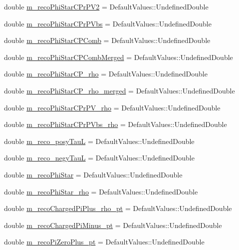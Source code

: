 \begin{DoxyCompactItemize}
\item 
double \hyperlink{classHttProduct_ac8e1ce629cd837f8fc345c13390ceec9}{m\_\-recoPhiStarCPrPV2} = DefaultValues::UndefinedDouble
\item 
double \hyperlink{classHttProduct_a098ffec9c6c3ed02c71847654cbbd3d4}{m\_\-recoPhiStarCPrPVbs} = DefaultValues::UndefinedDouble
\item 
double \hyperlink{classHttProduct_a94f1cb54eab52625888eda222d67e21d}{m\_\-recoPhiStarCPComb} = DefaultValues::UndefinedDouble
\item 
double \hyperlink{classHttProduct_a1d8bfbc2f1469b322c46f058b8a2eaf2}{m\_\-recoPhiStarCPCombMerged} = DefaultValues::UndefinedDouble
\item 
double \hyperlink{classHttProduct_a5aef45105c9b2e2069feeb411adf5904}{m\_\-recoPhiStarCP\_\-rho} = DefaultValues::UndefinedDouble
\item 
double \hyperlink{classHttProduct_acbda6aa9798ef7cb8c3cefb04cf81bce}{m\_\-recoPhiStarCP\_\-rho\_\-merged} = DefaultValues::UndefinedDouble
\item 
double \hyperlink{classHttProduct_a497bb3a130adff99248aba9890339632}{m\_\-recoPhiStarCPrPV\_\-rho} = DefaultValues::UndefinedDouble
\item 
double \hyperlink{classHttProduct_a5aede4ad7706e790207d27cdfe281525}{m\_\-recoPhiStarCPrPVbs\_\-rho} = DefaultValues::UndefinedDouble
\item 
double \hyperlink{classHttProduct_a8152fe5094df12ffcce5647c008f9f42}{m\_\-reco\_\-posyTauL} = DefaultValues::UndefinedDouble
\item 
double \hyperlink{classHttProduct_ab108952b461b79071c8dc6d25fb901b8}{m\_\-reco\_\-negyTauL} = DefaultValues::UndefinedDouble
\item 
double \hyperlink{classHttProduct_adce7e4fdde050504e61358f745be9c35}{m\_\-recoPhiStar} = DefaultValues::UndefinedDouble
\item 
double \hyperlink{classHttProduct_a382e6a65e1bc7bac27069f8cfff2d234}{m\_\-recoPhiStar\_\-rho} = DefaultValues::UndefinedDouble
\item 
double \hyperlink{classHttProduct_a213a48df02bd0bcf562c3cf636fc6df2}{m\_\-recoChargedPiPlus\_\-rho\_\-pt} = DefaultValues::UndefinedDouble
\item 
double \hyperlink{classHttProduct_a08d03c554a680c0d4009618907a50a5e}{m\_\-recoChargedPiMinus\_\-pt} = DefaultValues::UndefinedDouble
\item 
double \hyperlink{classHttProduct_a6e16f6cd5da93ccaa83bc33abc443189}{m\_\-recoPiZeroPlus\_\-pt} = DefaultValues::UndefinedDouble

\end{DoxyCompactItemize}
